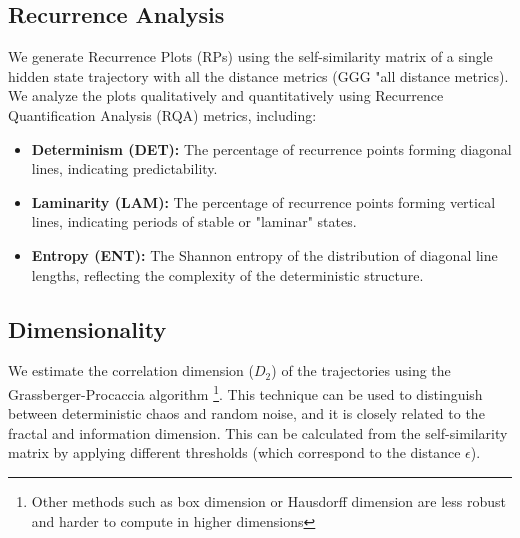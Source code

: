 \documentclass[a4paper,12pt]{article}
\begin{document}
\subsection{Recurrence Analysis}
\label{subsec:recurrence_analysis}
We generate Recurrence Plots (RPs) using the self-similarity matrix of a single hidden state trajectory with all the distance metrics (GGG "all distance metrics). We analyze the plots qualitatively and quantitatively using Recurrence Quantification Analysis (RQA) metrics, including:
\begin{itemize}
    \item \textbf{Determinism (DET):} The percentage of recurrence points forming diagonal lines, indicating predictability.
    \item \textbf{Laminarity (LAM):} The percentage of recurrence points forming vertical lines, indicating periods of stable or "laminar" states.
    \item \textbf{Entropy (ENT):} The Shannon entropy of the distribution of diagonal line lengths, reflecting the complexity of the deterministic structure.
\end{itemize} %


\subsection{Dimensionality}
\label{subsec:dimensionality_results}
We estimate the correlation dimension ($D_2$) of the trajectories using the Grassberger-Procaccia algorithm \cite{GRASSBERGER1983189} \footnote{Other methods such as box dimension or Hausdorff dimension are less robust and harder to compute in higher dimensions}. This technique can be used to distinguish between deterministic chaos and random noise, and it is closely related to the fractal and information dimension. This can be calculated from the self-similarity matrix by applying different thresholds (which correspond to the distance $\epsilon$). 


\end{document}
